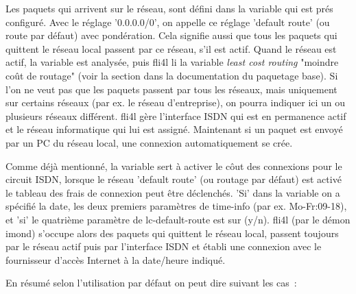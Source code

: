 Les paquets qui arrivent sur le réseau, sont défini dans la variable
 qui est prés configuré. Avec le réglage
'0.0.0.0/0', on appelle ce réglage 'default route' (ou route par défaut) avec
pondération. Cela signifie aussi que tous les paquets qui quittent le réseau
local passent par ce réseau, s'il est actif. Quand le réseau est actif, la
variable  est analysée, puis fli4l li la variable
\emph{least cost routing} "moindre coût de routage" (voir la section
dans la documentation du paquetage base). Si l'on ne veut pas que les paquets
passent par tous les réseaux, mais uniquement sur certains réseaux (par ex. le
réseau d'entreprise), on pourra indiquer ici un ou plusieurs réseaux différent.
fli4l gère l'interface ISDN qui est en permanence actif et le réseau informatique
qui lui est assigné. Maintenant si un paquet est envoyé par un PC du réseau local,
une connexion automatiquement se crée.

Comme déjà mentionné, la variable  sert à
activer le côut des connexions pour le circuit ISDN, lorsque le réseau
'default route' (ou routage par défaut) est activé le tableau des
frais de connexion peut être déclenchés. 'Si' dans la variable on a
spécifié la date, les deux premiers paramètres de time-info
(par ex. Mo-Fr:09-18), et 'si' le quatrième paramètre de
lc-default-route est sur (y/n). fli4l (par le démon imond) s'occupe
alors des paquets qui quittent le réseau local, passent toujours par
le réseau actif puis par l'interface ISDN et établi une connexion avec
le fournisseur d'accès Internet à la date/heure indiqué.

En résumé selon l'utilisation par défaut on peut dire suivant les cas~:

